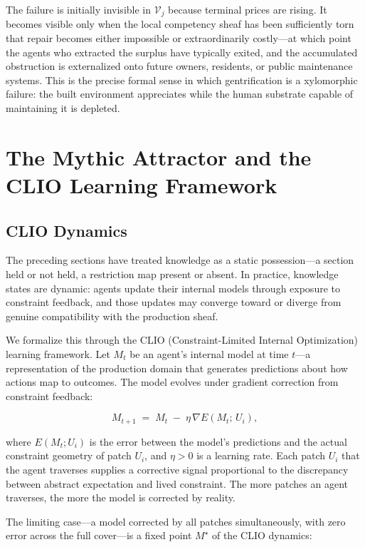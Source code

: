 \documentclass[12pt]{article}
\begin{document}
The failure is initially invisible in $\mathcal{V}_j$ because terminal prices are rising. It becomes visible only when the local competency sheaf has been sufficiently torn that repair becomes either impossible or extraordinarily costly---at which point the agents who extracted the surplus have typically exited, and the accumulated obstruction is externalized onto future owners, residents, or public maintenance systems. This is the precise formal sense in which gentrification is a xylomorphic failure: the built environment appreciates while the human substrate capable of maintaining it is depleted.


\section{The Mythic Attractor and the CLIO Learning Framework}

\subsection{CLIO Dynamics}

The preceding sections have treated knowledge as a static possession---a section held or not held, a restriction map present or absent. In practice, knowledge states are dynamic: agents update their internal models through exposure to constraint feedback, and those updates may converge toward or diverge from genuine compatibility with the production sheaf.

We formalize this through the CLIO (Constraint-Limited Internal Optimization) learning framework. Let $M_t$ be an agent's internal model at time $t$---a representation of the production domain that generates predictions about how actions map to outcomes. The model evolves under gradient correction from constraint feedback:

\begin{equation}
M_{t+1} \;=\; M_t \;-\; \eta\,\nabla E(M_t;\, U_i),
\end{equation}

where $E(M_t; U_i)$ is the error between the model's predictions and the actual constraint geometry of patch $U_i$, and $\eta > 0$ is a learning rate. Each patch $U_i$ that the agent traverses supplies a corrective signal proportional to the discrepancy between abstract expectation and lived constraint. The more patches an agent traverses, the more the model is corrected by reality.

The limiting case---a model corrected by all patches simultaneously, with zero error across the full cover---is a fixed point $M^\star$ of the CLIO dynamics:
\end{document}
